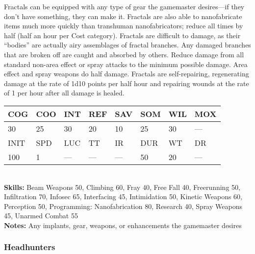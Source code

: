 Fractals can be equipped with any type of gear the gamemaster desires—if they don't have something, they can make it. Fractals are also able to nanofabricate items much more quickly than transhuman nanofabricators; reduce all times by half (half an hour per Cost category). Fractals are difficult to damage, as their ``bodies'' are actually airy assemblages of fractal branches. Any damaged branches that are broken off are caught and absorbed by others. Reduce damage from all standard non-area effect or spray attacks to the minimum possible damage. Area effect and spray weapons do half damage. Fractals are self-repairing, regenerating damage at the rate of 1d10 points per half hour and repairing wounds at the rate of 1 per hour after all damage is healed. \\ \begin{tabular}{|l|l|l|l|l|l|l|l|} \hline

COG &COO &INT &REF &SAV &SOM &WIL &MOX \\ \hline

30 &25 &30 &20 &10 &25 &30 &— \\ \hline

INIT &SPD &LUC &TT &IR &DUR &WT &DR \\ \hline

100 &1 &— &— &— &50 &20 &— \\ \hline

\end{tabular} \\ \textbf{Skills:} Beam Weapons 50, Climbing 60, Fray 40, Free Fall 40, Freerunning 50, Infiltration 70, Infosec 65, Interfacing 45, Intimidation 50, Kinetic Weapons 60, Perception 50, Programming: Nanofabrication 80, Research 40, Spray Weapons 45, Unarmed Combat 55 \\ \textbf{Notes:} Any implants, gear, weapons, or enhancements the gamemaster desires 



\subsubsection{Headhunters} 

